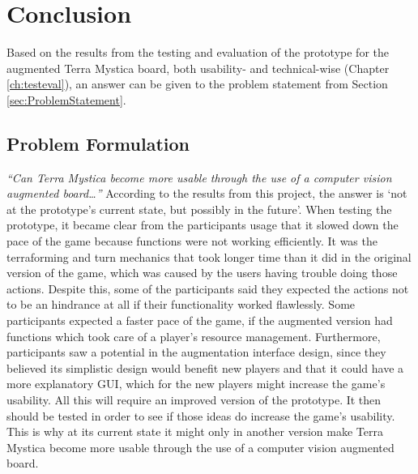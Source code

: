 \chapter{Conclusion}\label{ch:conclusion}
Based on the results from the testing and evaluation of the prototype for the augmented Terra Mystica board, both usability- and technical-wise (Chapter \ref{ch:testeval}), an answer can be given to the problem statement from Section \ref{sec:ProblemStatement}.

\section{Problem Formulation}
\textit{“Can Terra Mystica become more usable through the use of a computer vision augmented board…”} According to the results from this project, the answer is ‘not at the prototype’s current state, but possibly in the future’. When testing the prototype, it became clear from the participants usage that it slowed down the pace of the game because functions were not working efficiently. It was the terraforming and turn mechanics that took longer time than it did in the original version of the game, which was caused by the users having trouble doing those actions. Despite this, some of the participants said they expected the actions not to be an hindrance at all if their functionality worked flawlessly. Some participants expected a faster pace of the game, if the augmented version had functions which took care of a player’s resource management. Furthermore, participants saw a potential in the augmentation interface design, since they believed its simplistic design would benefit new players and that it could have a more explanatory GUI, which for the new players might increase the game’s usability. All this will require an improved version of the prototype. It then should be tested in order to see if those ideas do increase the game’s usability. This is why at its current state it might only in another version make Terra Mystica become more usable through the use of a computer vision augmented board.

